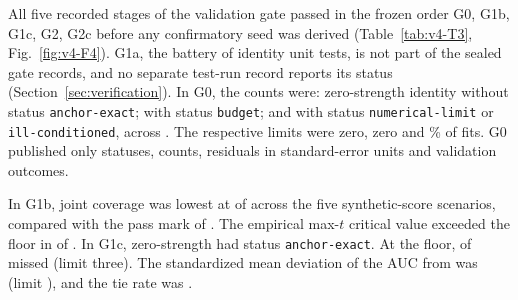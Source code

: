 All five recorded stages of the validation gate passed in the frozen order G0, G1b, G1c, G2, G2c before any confirmatory seed was derived (Table~\ref{tab:v4-T3}, Fig.~\ref{fig:v4-F4}). %
G1a, the battery of identity unit tests, is not part of the sealed gate records, and no separate test-run record reports its status (Section~\ref{sec:verification}). %
In G0, the counts were:  zero-strength identity  without status \texttt{anchor-exact};   with status \texttt{budget}; and   with status \texttt{numerical-limit} or \texttt{ill-conditioned}, across  . The respective limits were zero, zero and \% of fits. %
G0 published only statuses, counts, residuals in standard-error units and validation outcomes. %
\par In G1b, joint coverage was lowest at  of   across the five synthetic-score scenarios, compared with the pass mark of . The empirical max-$t$ critical value exceeded the  floor in  of  . %
In G1c,   zero-strength  had status \texttt{anchor-exact}. At the  floor,  of   missed  (limit three). The standardized mean deviation of the AUC from  was  (limit ), and the tie rate was . %
